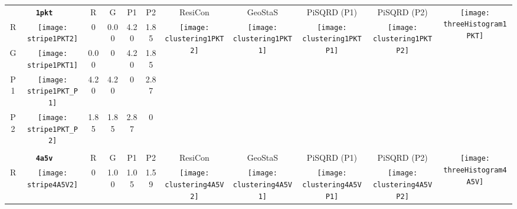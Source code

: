\documentclass[a4paper,11pt,twoside]{book}%
\begin{document}
\begin{appendices}
\begin{sidewaystable}[h!]
\sffamily
\begin{tabular*}{4cm}{cc|c|c|c|c|c|c|c|c|c|}
\cline{1-11}
\multicolumn{2}{|c|}{{\bf \texttt{1pkt}}} & R & G & P1 & P2 & ResiCon & GeoStaS & PiSQRD (P1) & PiSQRD (P2) & \multirow{5}{*}{\vspace{-0.15cm}\texttt{[image: threeHistogram1PKT]}}  \\
\cline{1-10}
\multicolumn{1}{|c|}{R} & \texttt{[image: stripe1PKT2]} & 0 & 0.00 & 4.20 & 1.85 & \multirow{4}{*}{\vspace{-0.3cm}\texttt{[image: clustering1PKT2]}} & \multirow{4}{*}{\vspace{-0.3cm}\texttt{[image: clustering1PKT1]}} & \multirow{4}{*}{\vspace{-0.3cm}\texttt{[image: clustering1PKTP1]}} & \multirow{4}{*}{\vspace{-0.3cm}\texttt{[image: clustering1PKTP2]}} &  \multirow{5}{*}{} \\
\cline{1-6}
\multicolumn{1}{|c|}{G} & \texttt{[image: stripe1PKT1]} & 0.00 & 0 & 4.20 & 1.85 & \multirow{4}{*}{} & \multirow{4}{*}{} & \multirow{4}{*}{} & \multirow{4}{*}{} & \multirow{5}{*}{} \\
\cline{1-6}
\multicolumn{1}{|c|}{P1} & \texttt{[image: stripe1PKT\_P1]} & 4.20 & 4.20 & 0 & 2.87 & \multirow{4}{*}{} & \multirow{4}{*}{} & \multirow{4}{*}{} & \multirow{4}{*}{} & \multirow{5}{*}{}  \\
\cline{1-6}
\multicolumn{1}{|c|}{P2} & \texttt{[image: stripe1PKT\_P2]} & 1.85 & 1.85 & 2.87 & 0 & \multirow{4}{*}{} & \multirow{4}{*}{} & \multirow{4}{*}{} & \multirow{4}{*}{} & \multirow{5}{*}{}  \\
\cline{1-11}
\\
\cline{1-11}
\multicolumn{2}{|c|}{{\bf \texttt{4a5v}}} & R & G & P1 & P2 & ResiCon & GeoStaS & PiSQRD (P1) & PiSQRD (P2) & \multirow{5}{*}{\vspace{-0.15cm}\texttt{[image: threeHistogram4A5V]}}  \\
\cline{1-10}
\multicolumn{1}{|c|}{R} & \texttt{[image: stripe4A5V2]} & 0 & 1.00 & 1.05 & 1.59 & \multirow{4}{*}{\vspace{-0.3cm}\texttt{[image: clustering4A5V2]}} & \multirow{4}{*}{\vspace{-0.3cm}\texttt{[image: clustering4A5V1]}} & \multirow{4}{*}{\vspace{-0.3cm}\texttt{[image: clustering4A5VP1]}} & \multirow{4}{*}{\vspace{-0.3cm}\texttt{[image: clustering4A5VP2]}} &  \multirow{5}{*}{} \\

\end{tabular*}
\end{sidewaystable}
\end{appendices}
\end{document}
